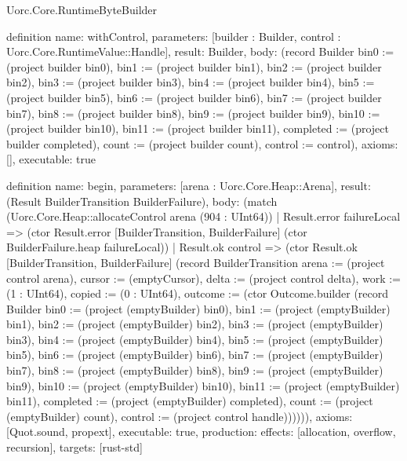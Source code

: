 \begin{lexlean}{Uorc.Core.RuntimeByteBuilder}
\begin{semanticmodule}
definition{
  name: withControl,
  parameters: [builder : Builder, control : Uorc.Core.RuntimeValue::Handle],
  result: Builder,
  body: (record Builder {bin0 := (project builder bin0), bin1 := (project builder bin1), bin2 := (project builder bin2), bin3 := (project builder bin3), bin4 := (project builder bin4), bin5 := (project builder bin5), bin6 := (project builder bin6), bin7 := (project builder bin7), bin8 := (project builder bin8), bin9 := (project builder bin9), bin10 := (project builder bin10), bin11 := (project builder bin11), completed := (project builder completed), count := (project builder count), control := control}),
  axioms: [],
  executable: true
}

definition{
  name: begin,
  parameters: [arena : Uorc.Core.Heap::Arena],
  result: (Result BuilderTransition BuilderFailure),
  body: (match (Uorc.Core.Heap::allocateControl arena (904 : UInt64))
    | Result.error failureLocal => (ctor Result.error [BuilderTransition, BuilderFailure] (ctor BuilderFailure.heap failureLocal))
    | Result.ok control => (ctor Result.ok [BuilderTransition, BuilderFailure] (record BuilderTransition {arena := (project control arena), cursor := (emptyCursor), delta := (project control delta), work := (1 : UInt64), copied := (0 : UInt64), outcome := (ctor Outcome.builder (record Builder {bin0 := (project (emptyBuilder) bin0), bin1 := (project (emptyBuilder) bin1), bin2 := (project (emptyBuilder) bin2), bin3 := (project (emptyBuilder) bin3), bin4 := (project (emptyBuilder) bin4), bin5 := (project (emptyBuilder) bin5), bin6 := (project (emptyBuilder) bin6), bin7 := (project (emptyBuilder) bin7), bin8 := (project (emptyBuilder) bin8), bin9 := (project (emptyBuilder) bin9), bin10 := (project (emptyBuilder) bin10), bin11 := (project (emptyBuilder) bin11), completed := (project (emptyBuilder) completed), count := (project (emptyBuilder) count), control := (project control handle)}))}))),
  axioms: [Quot.sound, propext],
  executable: true,
  production: {effects: [allocation, overflow, recursion], targets: [rust-std]}
}


\end{semanticmodule}
\end{lexlean}
